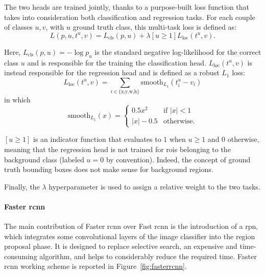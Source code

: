 \documentclass[%
    corpo=12pt,
    twoside,
    stile=classica,   
    tipotesi=magistrale,
    evenboxes,
    english,
	numerazioneromana,
]{toptesi}
\begin{document}
The two heads are trained jointly, thanks to a purpose-built loss function that takes into consideration both classification and regression tasks. For each couple of classes $u, v$, with $u$ ground truth class, this multi-task loss is defined as:
\begin{equation}
	L(p,u,t^u,v) = L_{\text{cls}}(p,u) + \lambda\left[u\geq1\right]L_{\text{loc}}(t^u,v).
	\label{eq:fastrcnn}
\end{equation}

Here, $L_{\text{cls}}(p,u) = -\log{p_u}$ is the standard negative log-likelihood for the correct class $u$ and is responsible for the training the classification head. $L_{\text{loc}}(t^u,v)$ is instead responsible for the regression head and is defined as a robust $L_1$ loss:
\begin{equation*}
	L_{\text{loc}}(t^u,v) = \sum_{i\in \text{\{x,y,w,h\}}}\text{smooth}_{L_1}(t_i^u - v_i)
\end{equation*}
in which
\begin{equation*}
	\text{smooth}_{L_1}(x) = \begin{cases}
		0.5x^2 & \text{if } |x| < 1\\
		|x| - 0.5 & \text{otherwise.}
		\end{cases}
\end{equation*}

$\left[u\geq1\right]$ is an indicator function that evaluates to $1$ when $u\geq1$ and $0$ otherwise, meaning that the regression head is not trained for \glspl{roi} belonging to the background class (labeled $u=0$ by convention). Indeed, the concept of ground truth bounding boxes does not make sense for background regions.

Finally, the $\lambda$ hyperparameter is used to assign a relative weight to the two tasks.

\paragraph{Faster \gls{rcnn}}\label{sec:fasterrcnn}
The main contribution of Faster \gls{rcnn}\cite{ren2016faster} over Fast \gls{rcnn} is the introduction of a \gls{rpn}, which integrates some convolutional layers of the image classifier into the region proposal phase. It is designed to replace selective search, an expensive and time-consuming algorithm, and helps to considerably reduce the required time. Faster \gls{rcnn} working scheme is reported in Figure~\ref{fig:fasterrcnn}.
\end{document}
